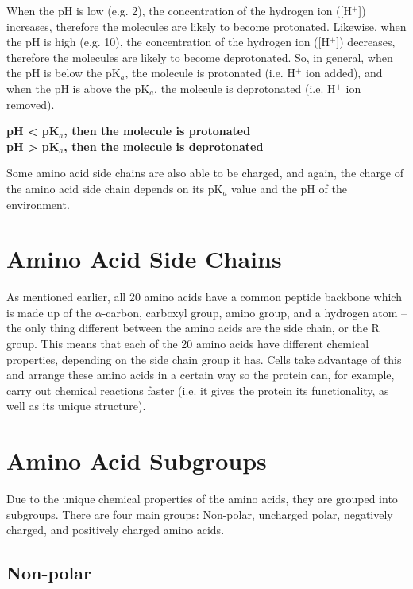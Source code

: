 \documentclass[a4paper, 12pt]{report}
\begin{document}
When the pH is low (e.g. 2), the concentration of the hydrogen ion ([H$^+$]) increases, therefore the molecules are likely to become protonated.
Likewise, when the pH is high (e.g. 10), the concentration of the hydrogen ion ([H$^+$]) decreases, therefore the molecules are likely to become deprotonated.
So, in general, when the pH is below the pK$_a$, the molecule is protonated (i.e. H$^+$ ion added), and when the pH is above the pK$_a$, the molecule is deprotonated (i.e. H$^+$ ion removed).

\begin{center}
    \textbf
        {pH \textless{} pK$_a$, then the molecule is protonated \\
        pH \textgreater{} pK$_a$, then the molecule is deprotonated}
\end{center}

Some amino acid side chains are also able to be charged, and again, the charge of the amino acid side chain depends on its pK$_a$ value and the pH of the environment.

\section{Amino Acid Side Chains}

As mentioned earlier, all 20 amino acids have a common peptide backbone which is made up of the $\alpha$-carbon, carboxyl group, amino group, and a hydrogen atom -- the only thing different between the amino acids are the side chain, or the R group.
This means that each of the 20 amino acids have different chemical properties, depending on the side chain group it has.
Cells take advantage of this and arrange these amino acids in a certain way so the protein can, for example, carry out chemical reactions faster (i.e. it gives the protein its functionality, as well as its unique structure).

\section{Amino Acid Subgroups}

Due to the unique chemical properties of the amino acids, they are grouped into subgroups.
There are four main groups: Non-polar, uncharged polar, negatively charged, and positively charged amino acids.

\subsection{Non-polar}
\end{document}

